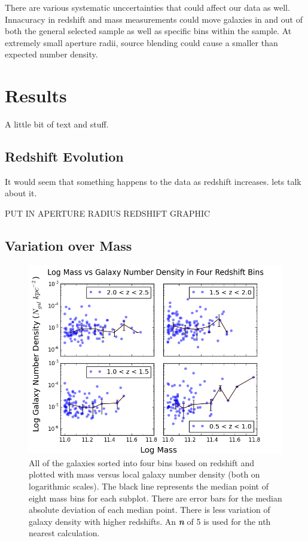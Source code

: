 \documentclass[apj]{emulateapj}
\begin{document}
There are various systematic unccertainties that could affect our data as well. Innacuracy in redshift and mass measurements could move galaxies in and out of both the general selected sample as well as specific bins within the sample. At extremely small aperture radii, source blending could cause a smaller than expected number density. 

\section{Results}

A little bit of text and stuff.

\subsection{Redshift Evolution}

It would seem that something happens to the data as redshift increases. lets talk about it.

PUT IN APERTURE RADIUS REDSHIFT GRAPHIC

\subsection{Variation over Mass}

\begin{figure}
\centering
\graphicspath{{C:/3d_hst/2015_finals/nth_nearest/}}
\includegraphics[width=\linewidth]{Mass_Density_Z}
\caption{\footnotesize All of the galaxies sorted into four bins based on redshift and plotted with mass versus local galaxy number density (both on logarithmic scales). The black line represents the median point of eight mass bins for each subplot. There are error bars for the median absolute deviation of each median point. There is less variation of galaxy density with higher redshifts. An \textbf{\textit{n}} of 5 is used for the nth nearest calculation.}
\label{fig:nth}
\end{figure}
\end{document}
